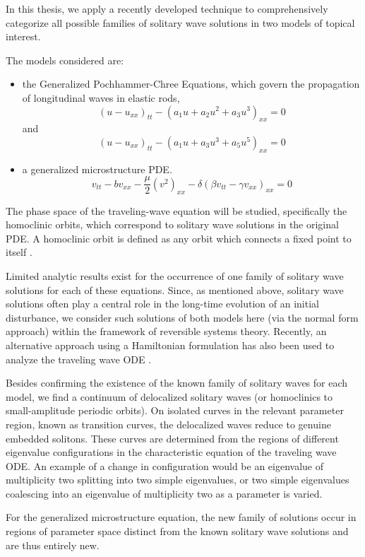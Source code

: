 In this thesis, we apply a recently developed technique to
comprehensively categorize all possible families of solitary wave
solutions in two models of topical interest.

The models considered are:
\begin{itemize}
\item the Generalized Pochhammer-Chree Equations, which  govern the
propagation of longitudinal waves in elastic rods,
\begin{equation}\label{eq:GPC1}
\left( u - u_{xx} \right)_{tt} - \left( a_1 u + a_2 u^2 + a_3 u^3 \right)_{xx} =0  
\end{equation}
and
\begin{equation}  \label{eq:GPC2} 
\left( u - u_{xx} \right)_{tt} - \left( a_1 u + a_3 u^3 + a_5 u^5 \right)_{xx} =0
\end{equation}

\item a generalized microstructure PDE.
\begin{equation}\label{eq:MS}
v_{tt} - b v_{xx} - \frac{\mu}{2} \left( v^2 \right)_{xx} - \delta \left( \beta v_{tt} - \gamma v_{xx}\right)_{xx} = 0 
\end{equation}
\end{itemize}

The phase space of the traveling-wave equation will be studied, specifically the
homoclinic orbits, which correspond to solitary wave solutions in the original
PDE. A homoclinic orbit is defined as any orbit which connects a fixed point to
itself \cite{Strogatz}.

Limited analytic results exist for the occurrence of one family
of  solitary wave solutions for each of these equations. Since, as
mentioned above, solitary wave solutions often play a central role in
the long-time evolution of an initial disturbance, we consider
such solutions of both models here (via the normal form approach)
within the framework of reversible systems theory. Recently, an
alternative approach using a Hamiltonian formulation has also
been used to analyze the traveling wave ODE \cite{LiZhang}.

Besides confirming the existence of the known family of solitary waves for each
model, we find a continuum of delocalized solitary waves (or homoclinics to
small-amplitude periodic orbits).  On isolated curves in the relevant parameter
region, known as transition curves, the delocalized waves reduce to genuine
embedded solitons.  These curves are determined from the regions of different
eigenvalue configurations in the characteristic equation of the traveling wave
ODE. An example of a change in configuration would be an eigenvalue of
multiplicity two splitting into two simple eigenvalues, or two simple
eigenvalues coalescing into an eigenvalue of multiplicity two as a parameter is
varied.

For the generalized microstructure equation, the new family of solutions occur
in regions of parameter space distinct from the known solitary wave solutions
and are thus entirely new. 
